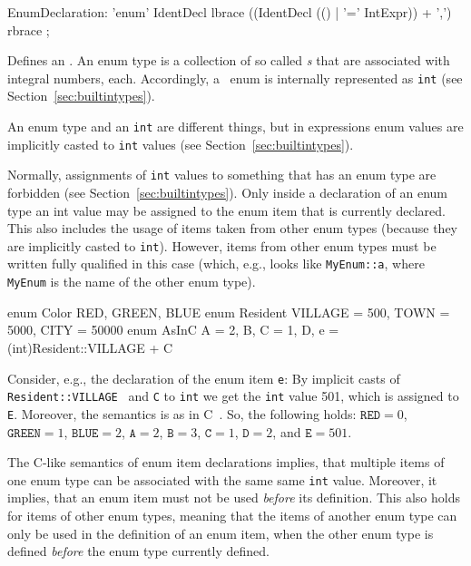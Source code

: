 \begin{rail}
  EnumDeclaration: 'enum' IdentDecl lbrace ((IdentDecl (() | '=' IntExpr)) + ',') rbrace ;
\end{rail}
Defines an .
An enum type is a collection of so called \emph{s} that are associated with integral numbers, each.
Accordingly, a \GrG\ enum is internally represented as \texttt{int} (see Section~\ref{sec:builtintypes}).
\begin{note}
	An enum type and an {\tt int} are different things, but in expressions enum values are implicitly casted to {\tt int} values 	(see Section~\ref{sec:builtintypes}).
\end{note}
\begin{note}
	Normally, assignments of {\tt int} values to something that has an enum type are forbidden (see Section~\ref{sec:builtintypes}).
	Only inside a declaration of an enum type an int value may be assigned to the enum item that is currently declared.
	This also includes the usage of items taken from other enum types (because they are implicitly casted to {\tt int}).
	However, items from other enum types must be written fully qualified in this case (which, e.g., looks like {\tt MyEnum::a}, where {\tt MyEnum} is the name of the other enum type).
\end{note}

\begin{example}
\begin{grgen}
enum Color {RED, GREEN, BLUE}
enum Resident {VILLAGE = 500, TOWN = 5000, CITY = 50000}
enum AsInC {A = 2, B, C = 1, D, e = (int)Resident::VILLAGE + C}
\end{grgen}
Consider, e.g., the declaration of the enum item {\tt e}:
By implicit casts of   {\tt Resident::VILLAGE } and {\tt C} to {\tt int} we get the {\tt int} value 501, which is assigned to {\tt E}.
Moreover, the semantics is as in C~\cite{Sch:1990:ANSIC}. So, the following holds: $\texttt{RED} = 0$, $\texttt{GREEN} = 1$, $\texttt{BLUE} = 2$, $\texttt{A}=2$, $\texttt{B}=3$, $\texttt{C}=1$, $\texttt{D}=2$, and $\texttt{E}=501$.
\end{example}
\begin{note}
	The C-like semantics of enum item declarations implies, that multiple items of one enum type can be associated with the same same {\tt int} value.
	Moreover, it implies, that an enum item must not be used \emph{before} its definition.
	This also holds for items of other enum types, meaning that the items of another enum type can only be used in the definition of an enum item, when the other enum type is defined \emph{before} the enum type currently defined.
\end{note}

